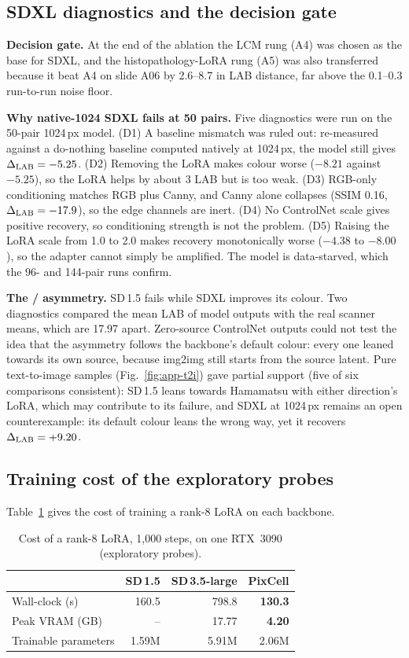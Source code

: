 \subsection{SDXL diagnostics and the decision gate}
\label{app:sdxl-diag}
\textbf{Decision gate.} At the end of the ablation the LCM rung (A4) was chosen as the base for SDXL,
and the histopathology-LoRA rung (A5) was also transferred because it beat A4 on slide A06 by 2.6--8.7 in LAB distance, far above
the 0.1--0.3 run-to-run noise floor.

\textbf{Why native-1024 SDXL fails at 50 pairs.} Five diagnostics were run on the 50-pair 1024\,px model.
(D1) A baseline mismatch was ruled out: re-measured against a do-nothing baseline computed natively at
1024\,px, the model still gives $\Delta_{\mathrm{LAB}}=-5.25$. (D2) Removing the LoRA makes colour worse ($-8.21$ against $-5.25$), so the LoRA helps by about 3
LAB but is too weak. (D3) RGB-only conditioning matches RGB plus Canny, and Canny alone collapses (SSIM 0.16,
$\Delta_{\mathrm{LAB}}=-17.9$), so the edge channels are inert. (D4) No ControlNet scale gives positive recovery, so conditioning strength is not the problem. (D5)
Raising the LoRA scale from 1.0 to 2.0 makes recovery monotonically worse ($-4.38$ to $-8.00$), so the adapter cannot simply be amplified. The model is
data-starved, which the 96- and 144-pair runs confirm.

\textbf{The \AtoH{}/\HtoA{} asymmetry.} SD\,1.5 fails \HtoA{} while SDXL improves its colour. Two diagnostics compared
the mean LAB of model outputs with the real scanner means, which are 17.97 apart. Zero-source ControlNet
outputs could not test the idea that the asymmetry follows the backbone's default colour: every one leaned
towards its own source, because img2img still starts from the source latent. Pure text-to-image samples (Fig.~\ref{fig:app-t2i}) gave partial support (five of
six comparisons consistent): SD\,1.5 leans towards Hamamatsu with either direction's LoRA, which may contribute
to its \HtoA{} failure, and SDXL at 1024\,px \HtoA{} remains an open counterexample: its default colour
leans the wrong way, yet it recovers $\Delta_{\mathrm{LAB}}=+9.20$.


\subsection{Training cost of the exploratory probes}
Table~\ref{tab:cost} gives the cost of training a rank-8 LoRA on each backbone.

\begin{table}[!tbp]
\centering
\caption{Cost of a rank-8 LoRA, 1{,}000 steps, on one RTX~3090 (exploratory probes).}
\label{tab:cost}
\footnotesize
\begin{tabular}{lrrr}
\toprule
& SD\,1.5 & SD\,3.5-large & PixCell\\
\midrule
Wall-clock (s) & 160.5 & 798.8 & \textbf{130.3}\\
Peak VRAM (GB) & -- & 17.77 & \textbf{4.20}\\
Trainable parameters & 1.59M & 5.91M & 2.06M\\
\bottomrule
\end{tabular}
\end{table}

